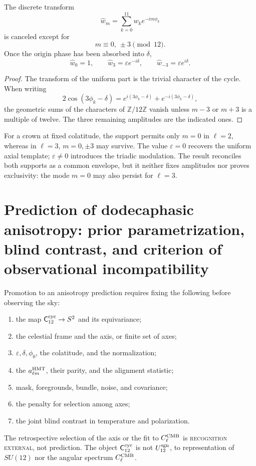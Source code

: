 \begin{theorem}
\label{thm:soporte-fourier-dodecafasico}
The discrete transform
\[
 \widehat w_m=\sum_{k=0}^{11}w_ke^{-im\phi_k}
\]
is canceled except for
\[
 m\equiv0,\ \pm3\pmod{12}.
\]
Once the origin phase has been absorbed into \(\delta\),
\[
 \widehat w_0=1,\qquad
 \widehat w_3=\varepsilon e^{-i\delta},\qquad
 \widehat w_{-3}=\varepsilon e^{i\delta}.
\]
\end{theorem}

\begin{proof}
The transform of the uniform part is the trivial character of the cycle. When
writing
\[
 2\cos(3\phi_k-\delta)
 =e^{i(3\phi_k-\delta)}+e^{-i(3\phi_k-\delta)},
\]
the geometric sums of the characters of \(\mathbb Z/12\mathbb Z\)
vanish unless \(m-3\) or \(m+3\) is a multiple of twelve. The three
remaining amplitudes are the indicated ones.
\end{proof}

For a crown at fixed colatitude, the support permits only \(m=0\) in
\(\ell=2\), whereas in \(\ell=3\),
\(m=0,\pm3\) may survive. The value \(\varepsilon=0\) recovers the uniform
axial template; \(\varepsilon\neq0\) introduces the triadic modulation. The result
reconciles both supports as a common envelope, but it neither fixes amplitudes
nor proves exclusivity: the mode \(m=0\) may also persist for
\(\ell=3\).

\section{Prediction of dodecaphasic anisotropy: prior parametrization, blind contrast, and criterion of observational incompatibility}
\label{sec:interfaz-cosmologica-c12}

Promotion to an anisotropy prediction requires fixing the following before observing
the sky:
\begin{enumerate}
 \item the map \(\mathsf C_{12}^{\rm cyc}\to S^2\) and its equivariance;
 \item the celestial frame and the axis, or finite set of axes;
 \item \(\varepsilon,\delta,\phi_0\), the colatitude, and the normalization;
 \item the \(a_{\ell m}^{\rm HMT}\), their parity, and the alignment
 statistic;
 \item mask, foregrounds, bundle, noise, and covariance;
 \item the penalty for selection among axes;
 \item the joint blind contrast in temperature and polarization.
\end{enumerate}
The retrospective selection of the axis or the fit to \(C_\ell^{\rm CMB}\) is
\textsc{recognition external}, not prediction. The object
\(\mathsf C_{12}^{\rm cyc}\) is not \(U_{12}^{\rm sgn}\), to
representation of \(SU(12)\) nor the angular spectrum
\(C_\ell^{\rm CMB}\).

